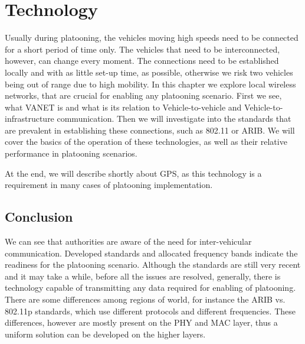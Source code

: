\section{Technology}\label{sec:technology}

Usually during platooning, the vehicles moving high speeds need to be connected for a short period of time only. The vehicles that need to be interconnected, however, can change every moment. The connections need to be established locally and with as little set-up time, as possible, otherwise we risk two vehicles being out of range due to high mobility. In this chapter we explore local wireless networks, that are crucial for enabling any platooning scenario. First we see, what VANET is and what is its relation to Vehicle-to-vehicle and Vehicle-to-infrastructure communication. Then we will investigate into the standards that are prevalent in establishing these connections, such as 802.11 or ARIB. We will cover the basics of the operation of these technologies, as well as their relative performance in platooning scenarios.\par
% 
At the end, we will describe shortly about GPS, as this technology is a requirement in many cases of platooning implementation.









\subsection{Conclusion}

We can see that authorities are aware of the need for inter-vehicular communication. Developed standards and allocated frequency bands indicate the readiness for the platooning scenario. Although the standards are still very recent and it may take a while, before all the issues are resolved, generally, there is technology capable of transmitting any data required for enabling of platooning. There are some differences among regions of world, for instance the ARIB vs. 802.11p standards, which use different protocols and different frequencies. These differences, however are mostly present on the PHY and MAC layer, thus a uniform solution can be developed on the higher layers.
